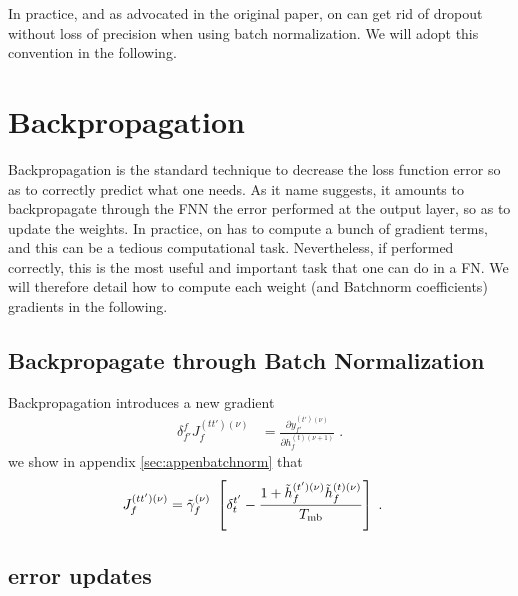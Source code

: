 In practice, and as advocated in the original paper, on can get rid of dropout without loss of precision when using batch normalization. We will adopt this convention in the following.


\section{Backpropagation}

Backpropagation\cite{LeCun:1998:EB:645754.668382} is the standard technique to decrease the loss function error so as to correctly predict what one needs. As it name suggests, it amounts to backpropagate through the FNN the error performed at the output layer, so as to update the weights. In practice, on has to compute a bunch of gradient terms, and this can be a tedious computational task. Nevertheless, if performed correctly, this is the most useful and important task that one can do in a FN. We will therefore detail how to compute each weight (and Batchnorm coefficients) gradients in the following.

\subsection{Backpropagate through Batch Normalization} \label{sec:Backpropbatchnorm}

Backpropagation introduces a new gradient 
\begin{align}
\delta^f_{f'}J^{(tt')(\nu)}_{f}&=\frac{\partial y^{(t')(\nu)}_{f'}}{\partial h_{f}^{(t)(\nu+1)}}\;.
\end{align}
we show in appendix \ref{sec:appenbatchnorm} that
\begin{align}
J^{(tt')(\nu)}_{f}&=\tilde{\gamma}^{(\nu)}_f\ \left[\delta^{t'}_t-
%
\frac{1+\tilde{h}_{f}^{(t')(\nu)}\tilde{h}_{f}^{(t)(\nu)}}{T_{{\rm mb}}}\right]\;.
\end{align}


\subsection{error updates}


